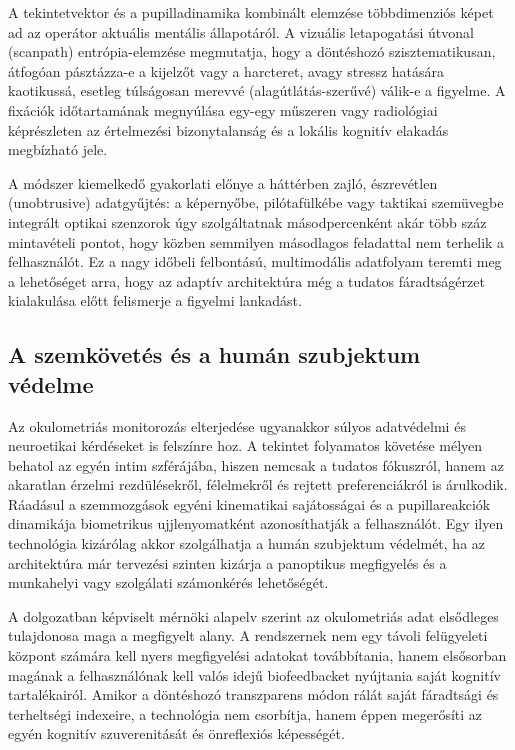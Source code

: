 \documentclass[12pt,a4paper,oneside]{book}
\begin{document}
A tekintetvektor és a pupilladinamika kombinált elemzése többdimenziós képet ad az operátor aktuális mentális állapotáról. A vizuális letapogatási útvonal (scanpath) entrópia-elemzése megmutatja, hogy a döntéshozó szisztematikusan, átfogóan pásztázza-e a kijelzőt vagy a harcteret, avagy stressz hatására kaotikussá, esetleg túlságosan merevvé (alagútlátás-szerűvé) válik-e a figyelme. A fixációk időtartamának megnyúlása egy-egy műszeren vagy radiológiai képrészleten az értelmezési bizonytalanság és a lokális kognitív elakadás megbízható jele.

A módszer kiemelkedő gyakorlati előnye a háttérben zajló, észrevétlen (unobtrusive) adatgyűjtés: a képernyőbe, pilótafülkébe vagy taktikai szemüvegbe integrált optikai szenzorok úgy szolgáltatnak másodpercenként akár több száz mintavételi pontot, hogy közben semmilyen másodlagos feladattal nem terhelik a felhasználót. Ez a nagy időbeli felbontású, multimodális adatfolyam teremti meg a lehetőséget arra, hogy az adaptív architektúra még a tudatos fáradtságérzet kialakulása előtt felismerje a figyelmi lankadást.

\subsection{A szemkövetés és a humán szubjektum védelme}

Az okulometriás monitorozás elterjedése ugyanakkor súlyos adatvédelmi és neuroetikai kérdéseket is felszínre hoz. A tekintet folyamatos követése mélyen behatol az egyén intim szférájába, hiszen nemcsak a tudatos fókuszról, hanem az akaratlan érzelmi rezdülésekről, félelmekről és rejtett preferenciákról is árulkodik. Ráadásul a szemmozgások egyéni kinematikai sajátosságai és a pupillareakciók dinamikája biometrikus ujjlenyomatként azonosíthatják a felhasználót. Egy ilyen technológia kizárólag akkor szolgálhatja a humán szubjektum védelmét, ha az architektúra már tervezési szinten kizárja a panoptikus megfigyelés és a munkahelyi vagy szolgálati számonkérés lehetőségét.

A dolgozatban képviselt mérnöki alapelv szerint az okulometriás adat elsődleges tulajdonosa maga a megfigyelt alany. A rendszernek nem egy távoli felügyeleti központ számára kell nyers megfigyelési adatokat továbbítania, hanem elsősorban magának a felhasználónak kell valós idejű biofeedbacket nyújtania saját kognitív tartalékairól. Amikor a döntéshozó transzparens módon rálát saját fáradtsági és terheltségi indexeire, a technológia nem csorbítja, hanem éppen megerősíti az egyén kognitív szuverenitását és önreflexiós képességét.
\end{document}
